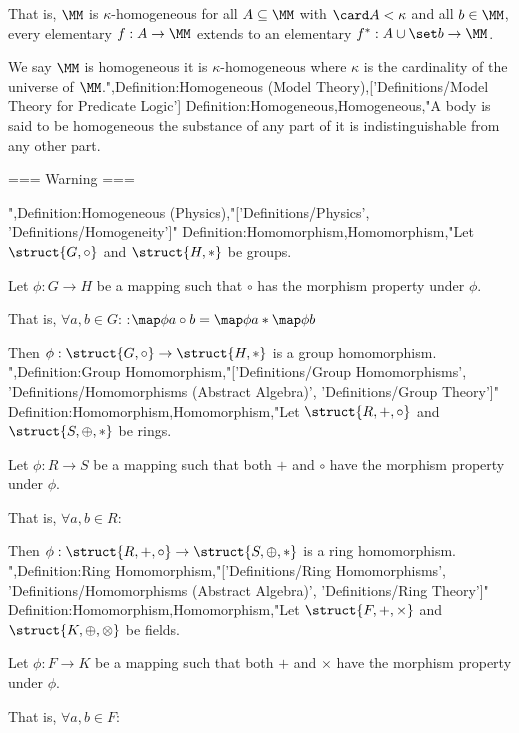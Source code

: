 That is, $\MM$ is $\kappa$-homogeneous  for all $A \subseteq \MM$ with  $\card A < \kappa$ and all $b \in \MM$, every elementary $f: A \to \MM$ extends to an elementary $f^*: A \cup \set b \to \MM$.


We say $\MM$ is homogeneous  it is $\kappa$-homogeneous where $\kappa$ is the cardinality of the universe of $\MM$.",Definition:Homogeneous (Model Theory),['Definitions/Model Theory for Predicate Logic']
Definition:Homogeneous,Homogeneous,"A body is said to be homogeneous  the substance of any part of it is indistinguishable from any other part.


=== Warning ===

",Definition:Homogeneous (Physics),"['Definitions/Physics', 'Definitions/Homogeneity']"
Definition:Homomorphism,Homomorphism,"Let $\struct {G, \circ}$ and $\struct {H, *}$ be groups.

Let $\phi: G \to H$ be a mapping such that $\circ$ has the morphism property under $\phi$.


That is, $\forall a, b \in G$:
:$\map \phi {a \circ b} = \map \phi a * \map \phi b$


Then $\phi: \struct {G, \circ} \to \struct {H, *}$ is a group homomorphism.
",Definition:Group Homomorphism,"['Definitions/Group Homomorphisms', 'Definitions/Homomorphisms (Abstract Algebra)', 'Definitions/Group Theory']"
Definition:Homomorphism,Homomorphism,"Let $\struct {R, +, \circ}$ and $\struct {S, \oplus, *}$ be rings.

Let $\phi: R \to S$ be a mapping such that both $+$ and $\circ$ have the morphism property under $\phi$.


That is, $\forall a, b \in R$:







Then $\phi: \struct {R, +, \circ} \to \struct {S, \oplus, *}$ is a ring homomorphism.
",Definition:Ring Homomorphism,"['Definitions/Ring Homomorphisms', 'Definitions/Homomorphisms (Abstract Algebra)', 'Definitions/Ring Theory']"
Definition:Homomorphism,Homomorphism,"Let $\struct {F, +, \times}$ and $\struct {K, \oplus, \otimes}$ be fields.

Let $\phi: F \to K$ be a mapping such that both $+$ and $\times$ have the morphism property under $\phi$.


That is, $\forall a, b \in F$:







